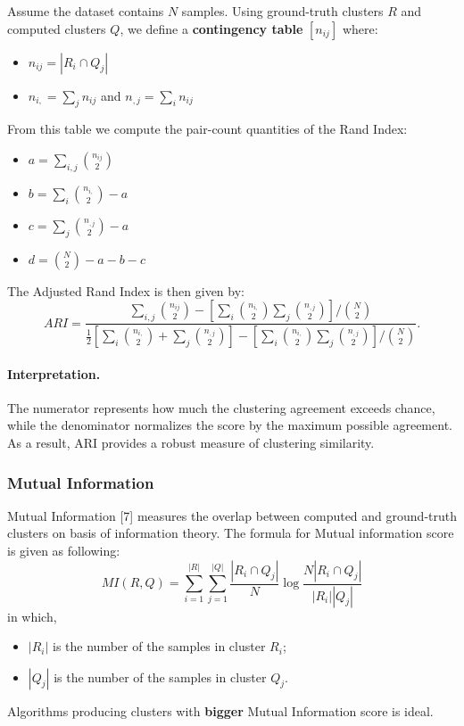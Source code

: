 \documentclass{article}
\renewcommand{\cite}[1]{[#1]}
\begin{document}
Assume the dataset contains $N$ samples. Using ground-truth clusters $R$ and computed 
clusters $Q$, we define a \textbf{contingency table} $[n_{ij}]$ where:

\begin{itemize}
    \item $n_{ij}=|R_i \cap Q_j|$
    \item $n_{i,}=\sum_j n_{ij}$ and $n_{,j}=\sum_i n_{ij}$
\end{itemize}

From this table we compute the pair-count quantities of the Rand Index:
\begin{itemize}
    \item $a=\displaystyle\sum_{i,j}\binom{n_{ij}}{2}$
    \item $b=\displaystyle\sum_i\binom{n_{i,}}{2}-a$
    \item $c=\displaystyle\sum_j\binom{n_{,j}}{2}-a$
    \item $d=\displaystyle\binom{N}{2}-a-b-c$
\end{itemize}

The Adjusted Rand Index is then given by:
\[
ARI=\frac{\sum_{i,j}\binom{n_{ij}}{2}-\left[\sum_i\binom{n_{i,}}{2}\sum_j\binom{n_{,j}}{2}\right]/\binom{N}{2}}
{\frac{1}{2}\left[\sum_i\binom{n_{i,}}{2}+\sum_j\binom{n_{,j}}{2}\right]
-\left[\sum_i\binom{n_{i,}}{2}\sum_j\binom{n_{,j}}{2}\right]/\binom{N}{2}}.
\]

\paragraph{Interpretation.}
The numerator represents how much the clustering agreement exceeds chance, while 
the denominator normalizes the score by the maximum possible agreement. 
As a result, ARI provides a robust measure of clustering similarity.

\subsubsection{Mutual Information}
Mutual Information \cite{7} measures the overlap between computed and ground-truth clusters on basis of information theory. The formula for Mutual information score is given as following:\[
MI(R, Q) = \sum_{i=1}^{|R|} \sum_{j=1}^{|Q|} \frac{|R_i \cap Q_j|}{N} \log \frac{N |R_i \cap Q_j|}{|R_i| |Q_j|}
\]
in which,\\
\begin{itemize}
    \item $|R_i|$ is the number of the samples in cluster $R_i$;
    \item $|Q_j|$ is the number of the samples in cluster $Q_j$.
\end{itemize}
Algorithms producing clusters with \textbf{bigger} Mutual Information score is ideal.
\end{document}
